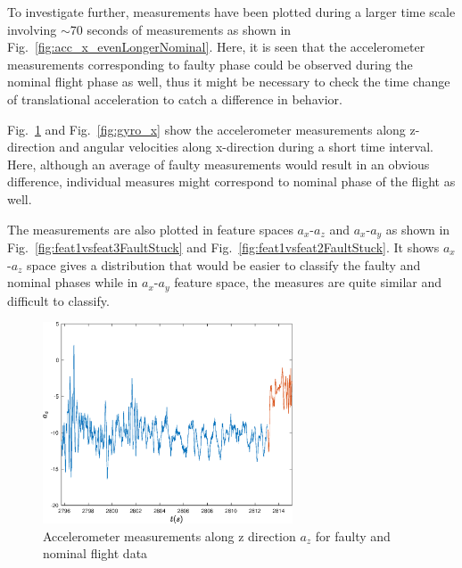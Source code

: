 



To investigate further, measurements have been plotted during a larger time scale involving $\sim$70 seconds of measurements as shown in Fig.~\ref{fig:acc_x_evenLongerNominal}. 
Here, it is seen that the accelerometer measurements corresponding to faulty phase could be observed during the nominal flight phase as well, thus it might be necessary to check the time change of translational acceleration to catch a difference in behavior. 

Fig.~\ref{fig:acc_z} and Fig.~\ref{fig:gyro_x} show the accelerometer measurements along z-direction and angular velocities along x-direction during a short time interval. 
Here, although an average of faulty measurements would result in an obvious difference, individual measures might correspond to nominal phase of the flight as well.

The measurements are also plotted in feature spaces $a_x$-$a_z$ and $a_x$-$a_y$ as shown in Fig.~\ref{fig:feat1vsfeat3FaultStuck} and Fig.~\ref{fig:feat1vsfeat2FaultStuck}. 
It shows $a_x$-$a_z$ space gives a distribution that would be easier to classify the faulty and nominal phases while in $a_x$-$a_y$ feature space, the measures are quite similar and difficult to classify.


\begin{figure}[H]
\begin{center}
\includegraphics[width=0.66\textwidth]{figures/acc_z}    %
\caption{Accelerometer measurements along z direction $a_z$ for faulty and nominal flight data} 
\label{fig:acc_z}
\end{center}
\end{figure}

